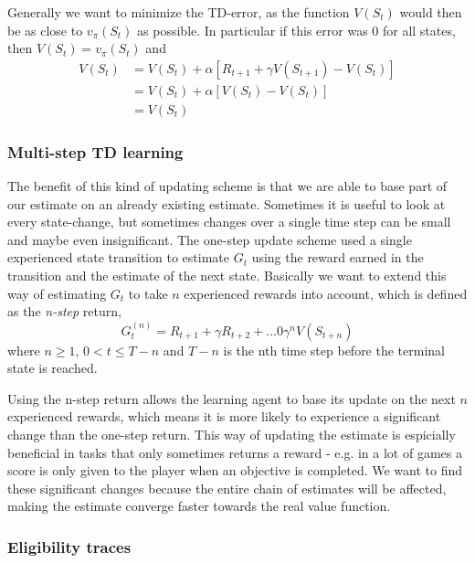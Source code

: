 \documentclass[11pt]{article}
\begin{document}
Generally we want to minimize the TD-error, as the function $V(S_t)$
would then be as close to $v_\pi(S_t)$ as possible.
In particular if this error was 0 for all states, then
$V(S_t) = v_\pi(S_t)$ and
\begin{align}
   V(S_t)  & = V(S_t) + \alpha  [R_{t+1} + \gamma  V(S_{t+1}) - V(S_t)]   \\
           & = V(S_t) + \alpha  [V(S_t) - V(S_t)]  \\
           & = V(S_t) 
\end{align}

\subsubsection{Multi-step TD learning}

The benefit of this kind of updating scheme is that we are able to base
part of our estimate on an already existing estimate.
Sometimes it is useful to look at every state-change, but sometimes
changes over a single time step can be small and maybe even insignificant.
The one-step update scheme used a single experienced state transition to estimate
$G_t$ using the reward earned in the transition and the estimate of the
next state.
Basically we want to extend this way of estimating $G_t$ to take $n$ experienced rewards
into account, which is defined as the \textit{n-step} return,
\begin{equation}
    G^{(n)}_t = R_{t+1} + \gamma R_{t+2} + \dots 0 \gamma^n V(S_{t+n})
\end{equation}
where $n \geq 1$, $0 < t \leq T - n$ and $T - n$ is the nth time step before the terminal state
is reached.

Using the n-step return allows the learning agent to base its update on the next $n$ experienced
rewards, which means it is more likely to experience a significant change than the one-step return.
This way of updating the estimate is espicially beneficial in tasks that only sometimes returns a reward
- e.g. in a lot of games a score is only given to the player when an objective is completed.
We want to find these significant changes because the entire chain of estimates 
will be affected, making the estimate converge faster towards the real value function.

\subsubsection{Eligibility traces}
\end{document}

